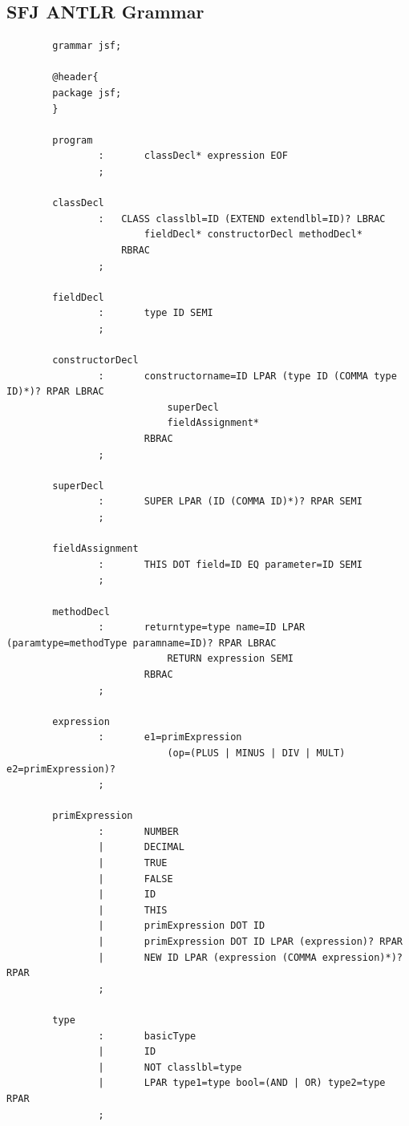 \documentclass{l4proj}
\begin{document}
\begin{appendices}


    \chapter{SFJ ANTLR Grammar}

    \begin{lstlisting}
        grammar jsf;

        @header{
        package jsf;
        }

        program
                :       classDecl* expression EOF
                ;

        classDecl
                :   CLASS classlbl=ID (EXTEND extendlbl=ID)? LBRAC
                        fieldDecl* constructorDecl methodDecl*
                    RBRAC
                ;

        fieldDecl
                :       type ID SEMI
                ;

        constructorDecl
                :       constructorname=ID LPAR (type ID (COMMA type ID)*)? RPAR LBRAC
                            superDecl
                            fieldAssignment*
                        RBRAC
                ;

        superDecl
                :       SUPER LPAR (ID (COMMA ID)*)? RPAR SEMI
                ;

        fieldAssignment
                :       THIS DOT field=ID EQ parameter=ID SEMI
                ;

        methodDecl
                :       returntype=type name=ID LPAR (paramtype=methodType paramname=ID)? RPAR LBRAC
                            RETURN expression SEMI
                        RBRAC
                ;

        expression
                :       e1=primExpression
                            (op=(PLUS | MINUS | DIV | MULT) e2=primExpression)?
                ;

        primExpression
                :       NUMBER
                |       DECIMAL
                |       TRUE
                |       FALSE
                |       ID
                |       THIS
                |       primExpression DOT ID
                |       primExpression DOT ID LPAR (expression)? RPAR
                |       NEW ID LPAR (expression (COMMA expression)*)? RPAR
                ;

        type
                :       basicType
                |       ID
                |       NOT classlbl=type
                |       LPAR type1=type bool=(AND | OR) type2=type RPAR
                ;


\end{lstlisting}
\end{appendices}
\end{document}
